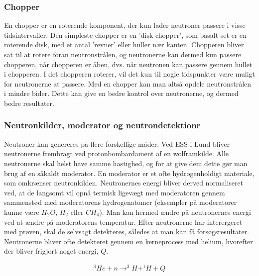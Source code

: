 \documentclass[12pt,oneside,a4paper]{article}
\begin{document}
{{{{{\subsubsection{Chopper}
En chopper er en roterende komponent, der kun lader neutroner passere i visse tidsintervaller. Den simpleste chopper er en 'disk chopper', som basalt set er en roterende disk, med et antal 'revner' eller huller nær kanten. Chopperen bliver sat til at rotere foran neutronstrålen, og neutronerne kan dermed kun passere chopperen, når chopperen er åben, dvs. når neutronen kan passere gennem hullet i chopperen. I det chopperen roterer, vil det kun til nogle tidspunkter være muligt for neutronerne at passere. Med en chopper kan man altså opdele neutronstrålen i mindre bider. Dette kan give en bedre kontrol over neutronerne, og dermed bedre resultater. \cite{ess_folder}

\subsubsection{Neutronkilder, moderator og neutrondetektionr}
Neutroner kan genereres på flere forskellige måder. Ved ESS i Lund bliver neutronerne frembragt ved protonbombardament af en wolframkilde. Alle neutronerne skal helst have samme hastighed, og for at give dem dette gør man brug af en såkaldt moderator. En moderator er et ofte hydrogenholdigt materiale, som omkrænser neutronkilden. Neutronernes energi bliver derved normaliseret ved, at de langsomt vil opnå termisk ligevægt med moderatoren gennem sammenstød med moderatorens hydrogenatomer (eksempler på moderatorer kunne være $H_2O$, $H_2$ eller $CH_4$). Man kan hermed ændre på neutronernes energi ved at ændre på moderatorens temperatur. 
Efter neutronerne har interergeret med prøven, skal de selvsagt detekteres, således at man kan få forsøgsresultater. Neutronerne 
bliver ofte detekteret gennem en kerneprocess med helium, hvorefter der bliver frigjort noget energi, $Q$. \cite{lefmann_arleth_kirkensgaard_lebech_thomsen}

\begin{align}
^3He + n \to  ^3H + ^1H + Q
\end{align}

}}}}}
\end{document}

